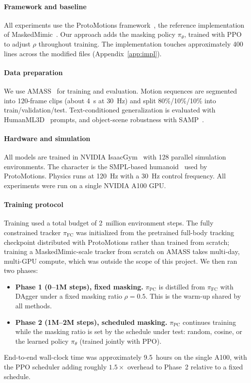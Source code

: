 \documentclass[10pt,letterpaper]{article}
\newcommand{\pfc}{\pi_{\mathrm{FC}}}
\newcommand{\ppc}{\pi_{\mathrm{PC}}}
\newcommand{\pth}{\pi_{\theta}}
\begin{document}
\paragraph{Framework and baseline}
All experiments use the ProtoMotions framework~\cite{protomotions}, the reference implementation of MaskedMimic~\cite{tessler2024maskedmimic}. Our approach adds the masking policy $\pth$, trained with PPO to adjust $\rho$ throughout training. The implementation touches approximately 400 lines across the modified files (Appendix~\ref{app:impl}).

\paragraph{Data preparation}
We use AMASS~\cite{mahmood2019amass} for training and evaluation. Motion sequences are segmented into 120-frame clips (about 4~s at 30~Hz) and split 80\%/10\%/10\% into train/validation/test. Text-conditioned generalization is evaluated with HumanML3D~\cite{guo2022humanml3d} prompts, and object-scene robustness with SAMP~\cite{hassan2021samp}.

\paragraph{Hardware and simulation}
All models are trained in NVIDIA IsaacGym~\cite{makoviychuk2021isaacgym} with 128 parallel simulation environments. The character is the SMPL-based humanoid~\cite{loper2015smpl} used by ProtoMotions. Physics runs at 120~Hz with a 30~Hz control frequency. All experiments were run on a single NVIDIA A100 GPU.

\paragraph{Training protocol}
Training used a total budget of 2~million environment steps. The fully constrained tracker $\pfc$ was initialized from the pretrained full-body tracking checkpoint distributed with ProtoMotions rather than trained from scratch; training a MaskedMimic-scale tracker from scratch on AMASS takes multi-day, multi-GPU compute, which was outside the scope of this project. We then ran two phases:
\begin{itemize}
  \item \textbf{Phase 1 (0--1M steps), fixed masking.} $\ppc$ is distilled from $\pfc$ with DAgger under a fixed masking ratio $\rho = 0.5$. This is the warm-up shared by all methods.
  \item \textbf{Phase 2 (1M--2M steps), scheduled masking.} $\ppc$ continues training while the masking ratio is set by the schedule under test: random, cosine, or the learned policy $\pth$ (trained jointly with PPO).
\end{itemize}
End-to-end wall-clock time was approximately 9.5~hours on the single A100, with the PPO scheduler adding roughly $1.5\times$ overhead to Phase~2 relative to a fixed schedule.
\end{document}
